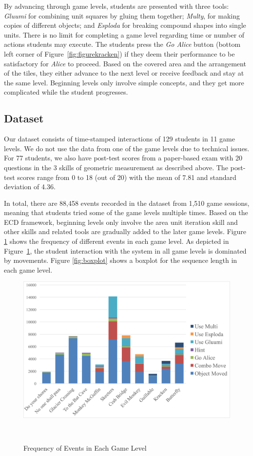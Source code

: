 \documentclass{sigchi}
\begin{document}
	By advancing through game levels, students are presented with three tools: \textit {Gluumi} for combining unit squares by gluing them together; \textit {Multy}, for making copies of different objects; and \textit {Esploda} for breaking compound shapes into single units.  
	There is no limit for completing a game level regarding time or number of actions students may execute. 
	The students press the \textit {Go Alice} button (bottom left corner of Figure~\ref{fig:figurekracken}) if they deem their performance to be satisfactory for \textit {Alice} to proceed. 
	Based on the covered area and the arrangement of the tiles, they either advance to the next level or receive feedback and stay at the same level.
	Beginning levels only involve simple concepts, and they get more complicated while the student progresses.
	
	\subsection{Dataset} 
	Our dataset consists of time-stamped interactions of 129 students in 11 game levels. 
	We do not use the data from one of the game levels due to technical issues.
	For 77 students, we also have post-test scores from a paper-based exam with 20 questions in the 3 skills of geometric measurement as described above.
	The post-test scores range from 0 to 18 (out of 20) with the mean of 7.81 and standard deviation of 4.36. 

	In total, there are 88,458 events recorded in the dataset from 1,510 game sessions, meaning that students tried some of the game levels  multiple times.
	Based on the ECD framework, beginning levels only involve the area unit iteration skill and other skills and related tools are gradually added to the later game levels.
	Figure \ref{fig:frequency} shows the frequency of different events in each game level. 
	As depicted in Figure~\ref{fig:frequency}, the student interaction with the system in all game levels is dominated by movements.
	Figure \ref{fig:boxplot} shows a boxplot for the sequence length in each game level. 

	
	\begin{figure}
		\centering
		\includegraphics[width=0.9\columnwidth]{figures/frequency.pdf}
		\caption{Frequency of Events in Each Game Level}~\label{fig:frequency}
	\end{figure}	
	
\end{document}
